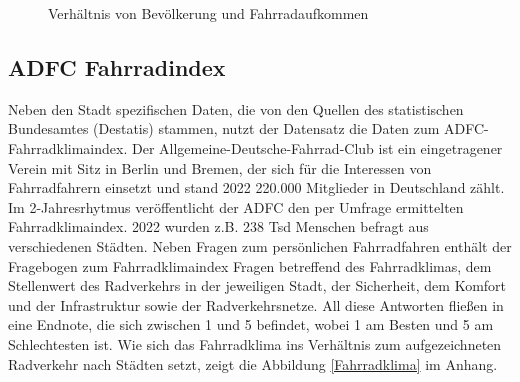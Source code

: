 \documentclass[a4paper,12pt]{thesis}
\begin{document}
\begin{figure}[!ht]%
	\centering
	\qquad
	\caption{Verhältnis von Bevölkerung und Fahrradaufkommen}%
	\label{fig:PKSundAusl}%
\end{figure}

\subsection{ADFC Fahrradindex}

Neben den Stadt spezifischen Daten, die von den Quellen des statistischen Bundesamtes (Destatis) stammen, nutzt der Datensatz die Daten zum ADFC-Fahrradklimaindex. Der Allgemeine-Deutsche-Fahrrad-Club ist ein eingetragener Verein mit Sitz in Berlin und Bremen, der sich für die Interessen von Fahrradfahrern einsetzt und stand 2022 220.000 Mitglieder in Deutschland zählt. Im 2-Jahresrhytmus veröffentlicht der ADFC den per Umfrage ermittelten Fahrradklimaindex. 2022 wurden z.B. 238 Tsd Menschen befragt aus verschiedenen Städten. Neben Fragen zum persönlichen Fahrradfahren enthält der Fragebogen zum Fahrradklimaindex Fragen betreffend des Fahrradklimas, dem Stellenwert des Radverkehrs in der jeweiligen Stadt, der Sicherheit, dem Komfort und der Infrastruktur sowie der Radverkehrsnetze. All diese Antworten fließen in eine Endnote, die sich zwischen 1 und 5 befindet, wobei 1 am Besten und 5 am Schlechtesten ist. Wie sich das Fahrradklima ins Verhältnis zum aufgezeichneten Radverkehr nach Städten setzt, zeigt die Abbildung \ref{Fahrradklima} im Anhang.
\end{document}
